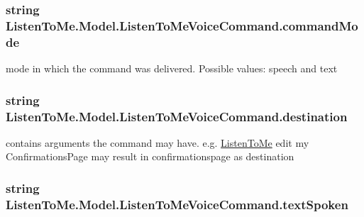 \subsubsection[{\texorpdfstring{command\+Mode}{commandMode}}]{\setlength{\rightskip}{0pt plus 5cm}string Listen\+To\+Me.\+Model.\+Listen\+To\+Me\+Voice\+Command.\+command\+Mode}\hypertarget{class_listen_to_me_1_1_model_1_1_listen_to_me_voice_command_a6243f032e7b44a3de833ae4362150b53}{}\label{class_listen_to_me_1_1_model_1_1_listen_to_me_voice_command_a6243f032e7b44a3de833ae4362150b53}


mode in which the command was delivered. Possible values\+: speech and text 

\subsubsection[{\texorpdfstring{destination}{destination}}]{\setlength{\rightskip}{0pt plus 5cm}string Listen\+To\+Me.\+Model.\+Listen\+To\+Me\+Voice\+Command.\+destination}\hypertarget{class_listen_to_me_1_1_model_1_1_listen_to_me_voice_command_a2d2a8120188ed1a16fefbb2461ab20f2}{}\label{class_listen_to_me_1_1_model_1_1_listen_to_me_voice_command_a2d2a8120188ed1a16fefbb2461ab20f2}


contains arguments the command may have. e.\+g. \hyperlink{namespace_listen_to_me}{Listen\+To\+Me} edit my Confirmations\+Page may result in confirmationspage as destination 

\subsubsection[{\texorpdfstring{text\+Spoken}{textSpoken}}]{\setlength{\rightskip}{0pt plus 5cm}string Listen\+To\+Me.\+Model.\+Listen\+To\+Me\+Voice\+Command.\+text\+Spoken}\hypertarget{class_listen_to_me_1_1_model_1_1_listen_to_me_voice_command_af82e41e09f7b7888d1ce9f6a0fa9ada8}{}\label{class_listen_to_me_1_1_model_1_1_listen_to_me_voice_command_af82e41e09f7b7888d1ce9f6a0fa9ada8}


